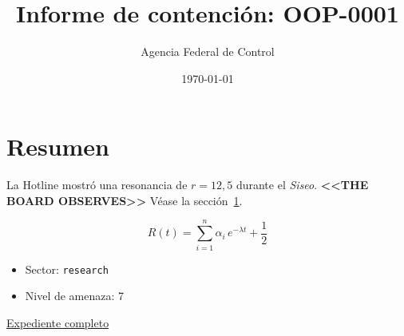 \documentclass[11pt,a4paper]{article}
\title{Informe de contención: OOP-0001}
\author{Agencia Federal de Control}
\date{\today}
\newcommand{\board}[1]{\textbf{<<#1>>}}
\begin{document}
\maketitle

\section{Resumen}\label{sec:resumen}
La Hotline mostró una resonancia de $r = 12{,}5$ durante el \emph{Siseo}.
\board{THE BOARD OBSERVES} Véase la sección~\ref{sec:resumen}.

\begin{equation}
  R(t) = \sum_{i=1}^{n} \alpha_i \, e^{-\lambda t} + \frac{1}{2}
\end{equation}

\begin{itemize}
  \item Sector: \texttt{research}
  \item Nivel de amenaza: 7
\end{itemize}

\href{https://example.invalid}{Expediente completo}
\end{document}
